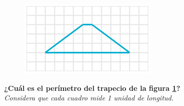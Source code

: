 \begin{figure}
    \centering
    \includegraphics[width=\linewidth]{../images/peri_trap_03}
    \caption{}
    \label{fig:peri_trap_03}
\end{figure}
\textbf{¿Cuál es el perímetro del trapecio de la figura \ref{fig:peri_trap_03}?}\\
\emph{Considera que cada cuadro mide 1 unidad de longitud.}
\vspace{3cm}
